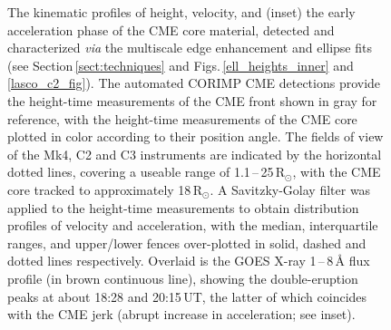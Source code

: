 \documentclass[namedreferences]{solarphysics}
\begin{document}
\begin{article}
\begin{figure}[!t]
\caption{The kinematic profiles of height, velocity, and (inset) the early acceleration phase of the CME core material, detected and characterized \emph{via} the multiscale edge enhancement and ellipse fits (see Section\,\ref{sect:techniques} and Figs.\,\ref{ell_heights_inner} and \ref{lasco_c2_fig}). The automated CORIMP CME detections provide the height-time measurements of the CME front shown in gray for reference, with the height-time measurements of the CME core  plotted in color according to their position angle. The fields of view of the Mk4, C2 and C3 instruments are indicated by the horizontal dotted lines, covering a useable range of 1.1\,--\,25\,R$_{\odot}$, with the CME core tracked to approximately 18\,R$_{\odot}$. A Savitzky-Golay filter was applied to the height-time measurements to obtain distribution profiles of velocity and acceleration, with the median, interquartile ranges, and upper/lower fences over-plotted in solid, dashed and dotted lines respectively. Overlaid is the GOES X-ray 1\,--\,8\,{\AA} flux profile (in brown continuous line), showing the double-eruption peaks at about 18:28 and 20:15\,UT, the latter of which coincides with the CME jerk (abrupt increase in acceleration; see inset).}
\label{kins_CMEcore}
\end{figure}


\end{article}
\end{document}
